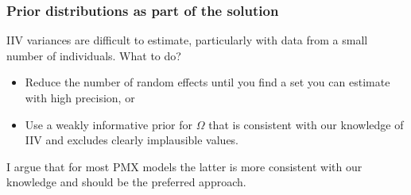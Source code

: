 \documentclass{beamer}
\begin{document}
\begin{frame}
  \frametitle{Prior distributions as part of the solution}
  
IIV variances are difficult to estimate, particularly with
    data from a small number of individuals. What to do?
  \begin{itemize}
  \item Reduce the number of random effects until you find a set you
    can estimate with high precision, or
\item Use a weakly informative prior for $\Omega$ that is consistent
  with our knowledge of IIV and excludes clearly
  implausible values.
  \end{itemize}
I argue that for most PMX models the latter is more consistent with
our knowledge and should be the preferred approach.



\end{frame}






  



\end{document}
